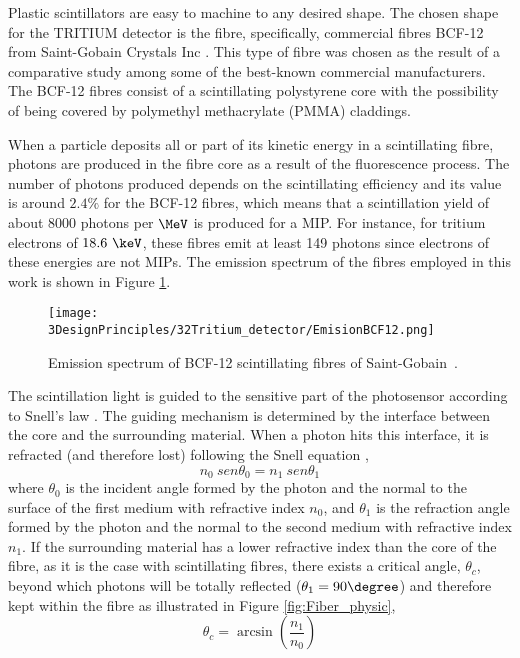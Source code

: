 Plastic scintillators are easy to machine to any desired shape. The chosen shape for the TRITIUM detector is the fibre, specifically, commercial fibres BCF-12 from Saint-Gobain Crystals Inc \cite{DataSheetBCF12Fiber}. This type of fibre was chosen as the result of a comparative study \cite{TFGAlberto} among some of the best-known commercial manufacturers. The BCF-12 fibres consist of a scintillating polystyrene core with the possibility of being covered by polymethyl methacrylate (PMMA) claddings. %

When a particle deposits all or part of its kinetic energy in a scintillating fibre, photons are produced in the fibre core as a result of the fluorescence process. The number of photons produced depends on the scintillating efficiency and its value is around $2.4\%$ for the BCF-12 fibres, which means that a scintillation yield of about $8000$ photons per $\MeV$ is produced for a MIP. For instance, for tritium electrons of $18.6~\keV$, these fibres emit at least 149 photons since electrons of these energies are not MIPs. The emission spectrum of the fibres employed in this work is shown in Figure \ref{fig:EmissionSpectrumFibers}.

\begin{figure}[htbp]
\centering
\texttt{[image: 3DesignPrinciples/32Tritium\_detector/EmisionBCF12.png]}
\caption{Emission spectrum of BCF-12 scintillating fibres of Saint-Gobain\label{fig:EmissionSpectrumFibers}~\cite{DataSheetBCF12Fiber}.}
\end{figure}

The scintillation light is guided to the sensitive part of the photosensor according to Snell's law \cite{Snell}. The guiding mechanism is determined by the interface between the core and the surrounding material. When a photon hits this interface, it is refracted (and therefore lost) following the Snell equation \cite{Snell}, 
\begin{equation}
n_0~sen\theta_0 = n_1~sen\theta_1
\label{eq:Snell}
\end{equation}
where $\theta_0$ is the incident angle formed by the photon and the normal to the surface of the first medium with refractive index $n_0$, and $\theta_1$  is the refraction angle formed by the photon and the normal to the second medium with refractive index $n_1$. If the surrounding material has a lower refractive index than the core of the fibre, as it is the case with scintillating fibres, there exists a critical angle, $\theta_c$, beyond which photons will be totally reflected ($\theta_1 = 90\degree$) and therefore kept within the fibre as illustrated in Figure \ref{fig:Fiber_physic},
\begin{equation}
\theta_c = \arcsin\left(\frac{n_1}{n_0} \right)
\label{eq:CriticAngle}
\end{equation}

